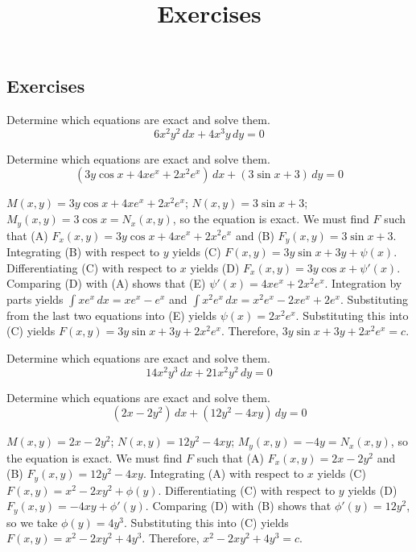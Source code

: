 \documentclass{ximera}
\title{Exercises} \license{CC BY-NC-SA 4.0}
\begin{document}
\begin{abstract}
\end{abstract}
\maketitle

\begin{onlineOnly}
\section*{Exercises}
\end{onlineOnly}





\begin{problem}\label{exer:2.5.1} Determine which equations are exact and solve them.
$$6x^2y^2\,dx+4x^3y\,dy=0$$
\end{problem}

\begin{problem}\label{exer:2.5.2} Determine which equations are exact and solve them.
$$(3y\cos x+4xe^x+2x^2e^x)\,dx+(3\sin x+3)\,dy=0$$



\begin{solution}
    $M(x,y)=3y\cos x+4xe^x+2x^2e^x$;\;
$N(x,y)=3\sin x+3$;\;
$M_y(x,y)=3\cos x=N_x(x,y)$,
so the  equation is exact.
We must find $F$ such that
(A) $F_x(x,y)=3y\cos x+4xe^x+2x^2e^x$ and
(B) $F_y(x,y)=3\sin x+3$.
Integrating (B) with respect to $y$ yields
(C) $F(x,y)=3y\sin x+3y+\psi(x)$.
Differentiating (C) with respect to $x$  yields
(D) $F_x(x,y)=3y\cos x+\psi'(x)$.
Comparing (D) with (A)  shows that
(E) $\psi'(x)=4xe^x+2x^2e^x$.
Integration by parts yields
$\int xe^x\,dx=xe^x-e^x$ and
$\int x^2e^x\,dx=x^2e^x-2xe^x+2e^x$.
Substituting from the last two equations into (E) yields
$\psi(x)=2x^2e^x$.
Substituting this into (C) yields
$F(x,y)=3y\sin x+3y+2x^2e^x$.
Therefore, $3y\sin x+3y+2x^2e^x=c$.
\end{solution}
\end{problem}

\begin{problem}\label{exer:2.5.3} Determine which equations are exact and solve them.
$$14x^2y^3\,dx+21 x^2y^2\,dy=0$$
\end{problem}

\begin{problem}\label{exer:2.5.4} Determine which equations are exact and solve them.
$$(2x-2y^2)\,dx+(12y^2-4xy)\,dy=0$$



\begin{solution}
    $M(x,y)=2x-2y^2$;\;
$N(x,y)=12y^2-4xy$;\;
$M_y(x,y)=-4y=N_x(x,y)$,
so the  equation is exact.
We must find $F$ such that
(A) $F_x(x,y)=2x-2y^2$ and
(B) $F_y(x,y)=12y^2-4xy$.
Integrating (A) with respect to $x$ yields
(C) $F(x,y)=x^2-2xy^2+\phi(y)$.
Differentiating (C) with respect to $y$  yields
(D) $F_y(x,y)=-4xy+\phi'(y)$.
Comparing (D) with (B)  shows that
$\phi'(y)=12y^2$, so we take
$\phi(y)=4y^3$.
Substituting this into (C) yields
$F(x,y)=x^2-2xy^2+4y^3$.
Therefore, $x^2-2xy^2+4y^3=c$.
\end{solution}
\end{problem}
\end{document}
